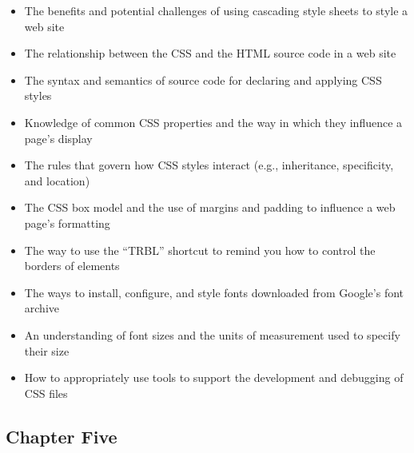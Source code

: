 \documentclass[11pt]{article}
\begin{document}
\begin{itemize}

  \itemsep 0in

  \item The benefits and potential challenges of using cascading style sheets to
    style a web site
  \item The relationship between the CSS and the HTML source code in a web site
  \item The syntax and semantics of source code for declaring and applying CSS
    styles
  \item Knowledge of common CSS properties and the way in which they influence
    a page's display
  \item The rules that govern how CSS styles interact (e.g., inheritance,
    specificity, and location)
  \item The CSS box model and the use of margins and padding to influence a web
    page's formatting
  \item The way to use the ``TRBL'' shortcut to remind you how to control the
    borders of elements
  \item The ways to install, configure, and style fonts downloaded from Google's
    font archive
  \item An understanding of font sizes and the units of measurement used to
    specify their size
  \item How to appropriately use tools to support the development and
    debugging of CSS files

\end{itemize}

\vspace*{-.2in}
\subsection*{Chapter Five}
\end{document}
